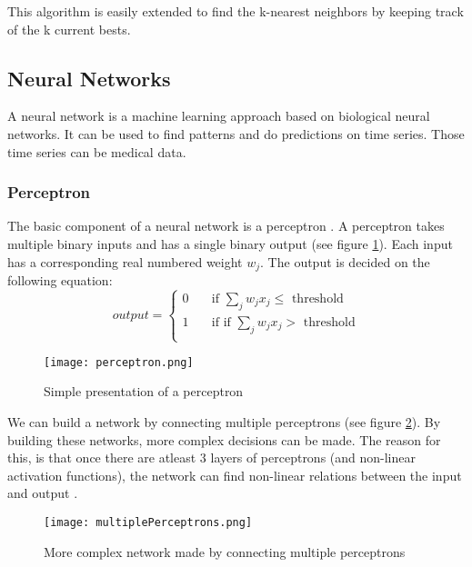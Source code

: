 This algorithm is easily extended to find the k-nearest neighbors by keeping track of the k current bests.
	
	\subsection{Neural Networks}
	
A neural network is a machine learning approach based on biological neural networks. It can be used to find patterns and do predictions on time series. Those time series can be medical data.


		\subsubsection{Perceptron}

The basic component of a neural network is a perceptron \cite{perceptron:article}. A perceptron takes multiple binary inputs and has a single binary output (see figure \ref{fig:perceptron}). Each input has a corresponding real numbered weight $w_j$. The output is decided on the following equation: \\

\begin{equation} 
output =
  \begin{cases}
    0       	& \quad \text{if } \sum_j w_jx_j \leq \text{ threshold}\\
    1  		& \quad \text{if } \text{if } \sum_j w_jx_j > \text{ threshold}\\
  \end{cases}
\end{equation}
	
\begin{figure}[!htb]
	\centering
	\texttt{[image: perceptron.png]}
	\caption{Simple presentation of a perceptron \cite{NNintro:online}}
	\label{fig:perceptron}
\end{figure}

We can build a network by connecting multiple perceptrons (see figure \ref{fig:multiplePerceptrons}). By building these networks, more complex decisions can be made. The reason for this, is that once there are atleast $3$ layers of perceptrons (and non-linear activation functions), the network can find non-linear relations between the input and output \cite{nnNL:article}. \\

\begin{figure}[!htb]
	\centering
	\texttt{[image: multiplePerceptrons.png]}
	\caption{More complex network made by connecting multiple perceptrons \cite{NNintro:online}}
	\label{fig:multiplePerceptrons}
\end{figure}

